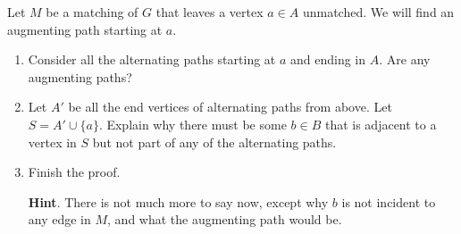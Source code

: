 \documentclass{book}
\begin{document}
\setcounter{cpjt}{60}
\addtocounter{cpjt}{-1}
\begin{activity}\label{activity-53}
\hypertarget{p-452}{}%
Let \(M\) be a matching of \(G\) that leaves a vertex \(a \in A\) unmatched.  We will find an augmenting path starting at \(a\).%
\begin{enumerate}[font=\bfseries,label=(\alph*),ref=\alph*]
\item\label{task-63} \hypertarget{p-453}{}%
Consider all the alternating paths starting at \(a\) and ending in \(A\).  Are any augmenting paths?%
\item\label{task-64} \hypertarget{p-454}{}%
Let \(A'\) be all the end vertices of alternating paths from above.  Let \(S = A' \cup \{a\}\).  Explain why there must be some \(b \in B\) that is adjacent to a vertex in \(S\) but not part of any of the alternating paths.%
\item\label{task-65} \hypertarget{p-455}{}%
Finish the proof.%
\par\smallskip%
\noindent\textbf{Hint}.\hypertarget{hint-24}{}\quad%
\hypertarget{p-456}{}%
There is not much more to say now, except why \(b\) is not incident to any edge in \(M\), and what the augmenting path would be.%
\end{enumerate}
\end{activity}

\clearpage
\end{document}
